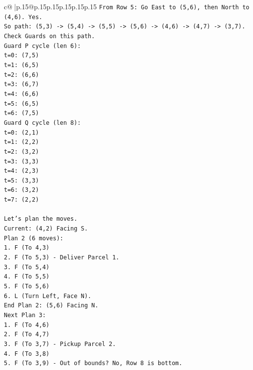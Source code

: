 \documentclass{article}
\begin{document}
{\begin{supertabular}{c@{$\;$}|p{.15\linewidth}@{}p{.15\linewidth}p{.15\linewidth}p{.15\linewidth}p{.15\linewidth}p{.15\linewidth}}
{{{\texttt{From Row 5: Go East to (5,6), then North to (4,6). Yes.} \\
\texttt{So path: (5,3) {-}> (5,4) {-}> (5,5) {-}> (5,6) {-}> (4,6) {-}> (4,7) {-}> (3,7).} \\
\texttt{Check Guards on this path.} \\
\texttt{Guard P cycle (len 6):} \\
\texttt{t=0: (7,5)} \\
\texttt{t=1: (6,5)} \\
\texttt{t=2: (6,6)} \\
\texttt{t=3: (6,7)} \\
\texttt{t=4: (6,6)} \\
\texttt{t=5: (6,5)} \\
\texttt{t=6: (7,5)} \\
\texttt{Guard Q cycle (len 8):} \\
\texttt{t=0: (2,1)} \\
\texttt{t=1: (2,2)} \\
\texttt{t=2: (3,2)} \\
\texttt{t=3: (3,3)} \\
\texttt{t=4: (2,3)} \\
\texttt{t=5: (3,3)} \\
\texttt{t=6: (3,2)} \\
\texttt{t=7: (2,2)} \\
\\ 
\texttt{Let's plan the moves.} \\
\texttt{Current: (4,2) Facing S.} \\
\texttt{Plan 2 (6 moves):} \\
\texttt{1. F (To 4,3)} \\
\texttt{2. F (To 5,3) {-} Deliver Parcel 1.} \\
\texttt{3. F (To 5,4)} \\
\texttt{4. F (To 5,5)} \\
\texttt{5. F (To 5,6)} \\
\texttt{6. L (Turn Left, Face N).} \\
\texttt{End Plan 2: (5,6) Facing N.} \\
\texttt{Next Plan 3:} \\
\texttt{1. F (To 4,6)} \\
\texttt{2. F (To 4,7)} \\
\texttt{3. F (To 3,7) {-} Pickup Parcel 2.} \\
\texttt{4. F (To 3,8)} \\
\texttt{5. F (To 3,9) {-} Out of bounds? No, Row 8 is bottom.} \\
}}}
\end{supertabular}}
\end{document}
